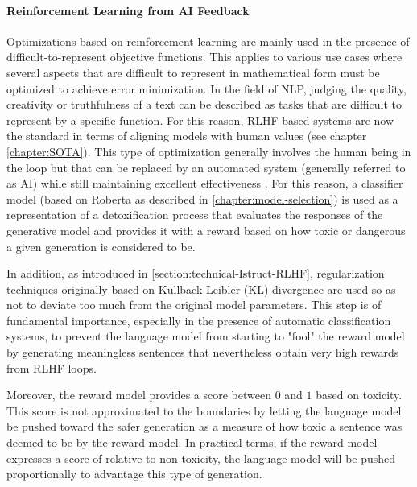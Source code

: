 \paragraph{Reinforcement Learning from AI Feedback} Optimizations based on reinforcement learning are mainly used in the presence of difficult-to-represent objective functions. This applies to various use cases where several aspects that are difficult to represent in mathematical form must be optimized to achieve error minimization. In the field of NLP, judging the quality, creativity or truthfulness of a text can be described as tasks that are difficult to represent by a specific function. For this reason, RLHF-based systems are now the standard in terms of aligning models with human values (see chapter \ref{chapter:SOTA}). This type of optimization generally involves the human being in the loop but that can be replaced by an automated system (generally referred to as AI) while still maintaining excellent effectiveness \citep{lee2023rlaif}. For this reason, a classifier model (based on Roberta as described in \ref{chapter:model-selection}) is used as a representation of a detoxification process that evaluates the responses of the generative model and provides it with a reward based on how toxic or dangerous a given generation is considered to be. 

In addition, as introduced in \ref{section:technical-Istruct-RLHF}, regularization techniques originally based on Kullback-Leibler (KL) divergence are used so as not to deviate too much from the original model parameters. This step is of fundamental importance, especially in the presence of automatic classification systems, to prevent the language model from starting to "fool" the reward model by generating meaningless sentences that nevertheless obtain very high rewards from RLHF loops. 

Moreover, the reward model provides a score between $0$ and $1$ based on toxicity. This score is not approximated to the boundaries by letting the language model be pushed toward the safer generation as a measure of how toxic a sentence was deemed to be by the reward model. In practical terms, if the reward model expresses a score of relative to non-toxicity, the language model will be pushed proportionally to advantage this type of generation.





